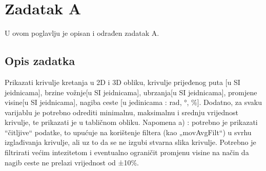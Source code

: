 \chapter{Zadatak A} \label{ch:a}
U ovom poglavlju je opisan i odrađen zadatak A.

\section{Opis zadatka}
Prikazati krivulje kretanja u 2D i 3D obliku, krivulje prijeđenog puta [u SI jeidnicama], brzine vožnje[u
SI jeidnicama], ubrzanja[u SI jeidnicama], promjene visine[u SI jeidnicama], nagiba ceste [u
jedinicama : rad, °, \%]. Dodatno, za svaku varijablu je potrebno odrediti minimalnu, maksimalnu i
srednju vrijednost krivulje, te prikazati je u tabličnom obliku.
Napomena a) : potrebno je prikazati “čitljive“ podatke, to upućuje na korištenje filtera (kao
„movAvgFilt“) u svrhu izglađivanja krivulje, ali uz to da se ne izgubi stvarna slika krivulje. Potrebno
je filtrirati većim intezitetom i eventualno ograničit promjenu visine na način da nagib ceste ne
prelazi vrijednost od ±10\%.